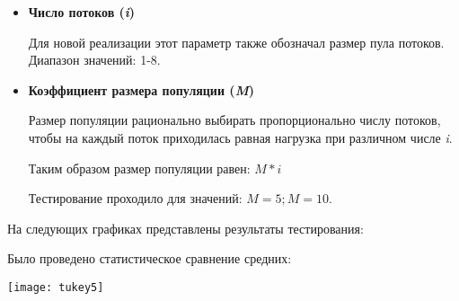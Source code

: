 \begin{itemize}
    \item \textbf{Число потоков (\textit{i})}

        Для новой реализации этот параметр также
        обозначал размер пула потоков.
        Диапазон значений: 1-8.
    \item \textbf{Коэффициент размера популяции (\textit{M})}

        Размер популяции рационально выбирать
        пропорционально числу потоков,
        чтобы на каждый поток приходилась
        равная нагрузка при различном
        числе \textit{i}.

        Таким образом размер популяции равен:
        \begin{math}M * i\end{math}

        Тестирование проходило для значений:
        \begin{math}M = 5; M = 10\end{math}.
\end{itemize}

На следующих графиках представлены результаты тестирования:




Было проведено статистическое сравнение средних:

\texttt{[image: tukey5]}

